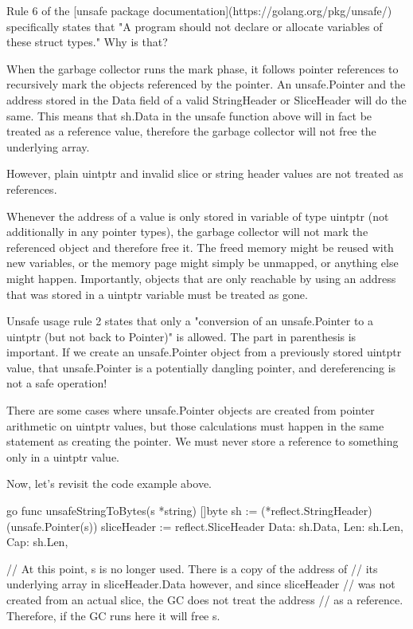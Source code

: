         Rule 6 of the [unsafe package documentation](https://golang.org/pkg/unsafe/) specifically states that "A program
        should not declare or allocate variables of these struct types." Why is that?

        When the garbage collector runs the mark phase, it follows pointer references to recursively mark the objects referenced
        by the pointer. An unsafe.Pointer and the address stored in the Data field of a valid StringHeader or SliceHeader
        will do the same. This means that sh.Data in the unsafe function above will in fact be treated as a reference value,
        therefore the garbage collector will not free the underlying array.

        However, plain uintptr and invalid slice or string header values are not treated as references.

        Whenever the address of a value is only stored in variable of type uintptr (not additionally in any pointer types),
        the garbage collector will not mark the referenced object and therefore free it. The freed memory might be reused with
        new variables, or the memory page might simply be unmapped, or anything else might happen. Importantly, objects that are
        only reachable by using an address that was stored in a uintptr variable must be treated as gone.

        Unsafe usage rule 2 states that only a "conversion of an unsafe.Pointer to a uintptr (but not back to Pointer)"
        is allowed. The part in parenthesis is important. If we create an unsafe.Pointer object from a previously stored
        uintptr value, that unsafe.Pointer is a potentially dangling pointer, and dereferencing is not a safe operation!

        There are some cases where unsafe.Pointer objects are created from pointer arithmetic on uintptr values, but those
        calculations must happen in the same statement as creating the pointer. We must never store a reference to something
        only in a uintptr value.

        Now, let's revisit the code example above.

        go
        func unsafeStringToBytes(s *string) []byte
        sh := (*reflect.StringHeader)(unsafe.Pointer(s))
        sliceHeader := reflect.SliceHeader
        Data: sh.Data,
        Len:  sh.Len,
        Cap:  sh.Len,


        // At this point, s is no longer used. There is a copy of the address of
        // its underlying array in sliceHeader.Data however, and since sliceHeader
        // was not created from an actual slice, the GC does not treat the address
        // as a reference. Therefore, if the GC runs here it will free s.

